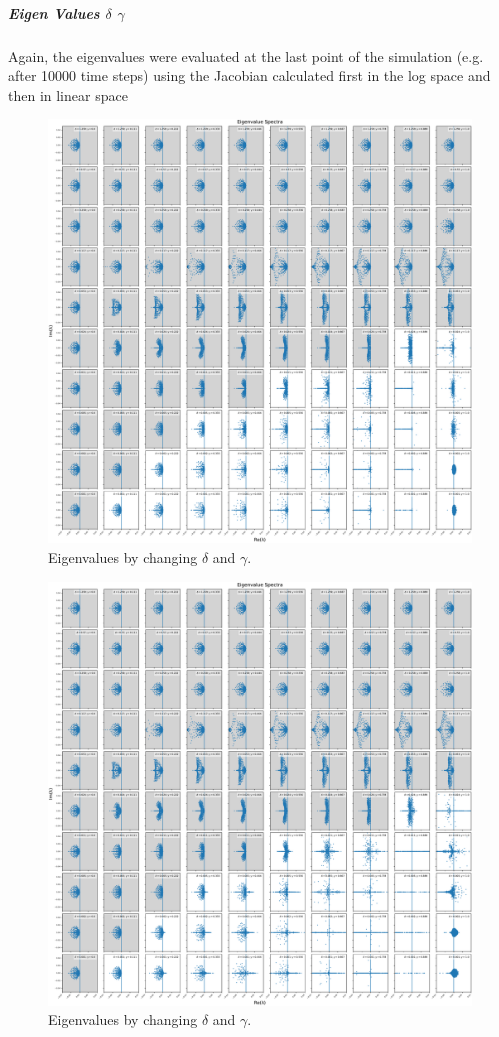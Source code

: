 \documentclass[11pt,a4paper,fleqn]{scrartcl}
\begin{document}
\clearpage
\subparagraph{Eigen Values $\delta$ $\gamma$}

Again, the eigenvalues were evaluated at the last point of the simulation (e.g. after 10000 time steps) using the Jacobian calculated first in the log space and then in linear space

\begin{figure}[H]
    \centering
    \includegraphics[width=\linewidth]{DeltaGamma/EigenValuesDeltaGammaLog.pdf}
    \caption{Eigenvalues by changing $\delta$ and $\gamma$.}
\end{figure}


\begin{figure}[H]
    \centering
    \includegraphics[width=\linewidth]{DeltaGamma/EigenValuesDeltaGammaLin.pdf}
    \caption{Eigenvalues by changing $\delta$ and $\gamma$.}
\end{figure}
\end{document}
